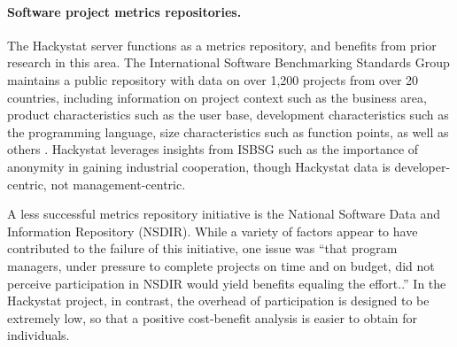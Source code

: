 \vspace*{-.15in} \paragraph{Software project metrics repositories.}

The Hackystat server functions as a metrics repository, and benefits from
prior research in this area.  The International Software Benchmarking
Standards Group maintains a public repository with data on over 1,200
projects from over 20 countries, including information on project context
such as the business area, product characteristics such as the user base,
development characteristics such as the programming language, size
characteristics such as function points, as well as others \cite{Lokan01}.
Hackystat leverages insights from ISBSG such as the importance of anonymity
in gaining industrial cooperation, though Hackystat data is
developer-centric, not management-centric.

A less successful metrics repository initiative is the National Software
Data and Information Repository (NSDIR). While a variety of factors appear
to have contributed to the failure of this initiative, one issue was ``that
program managers, under pressure to complete projects on time and on
budget, did not perceive participation in NSDIR would yield benefits
equaling the effort.\cite{Goth01}.''  In the Hackystat project, in
contrast, the overhead of participation is designed to be extremely low, so
that a positive cost-benefit analysis is easier to obtain for individuals.











